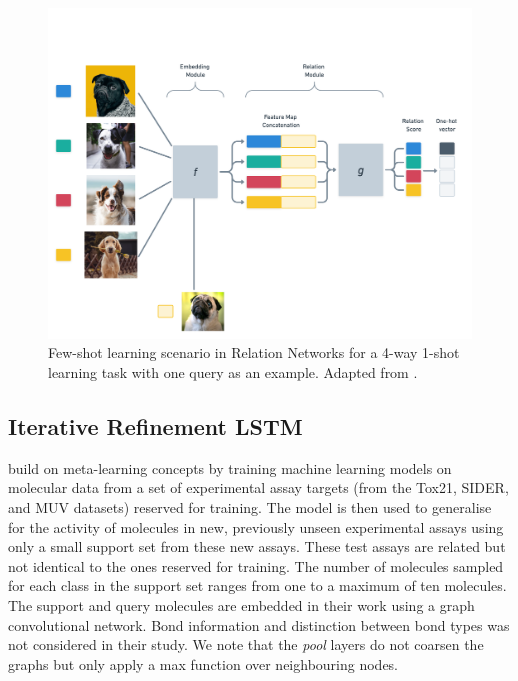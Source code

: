 \begin{figure}[h]
    \centering
    \includegraphics[width=0.9\linewidth]{img/RelationNetAdapt.png}
    \caption[Relation Networks]{Few-shot learning scenario in Relation Networks for a 4-way 1-shot learning task with one query as an example. Adapted from \citet{sung2018learning}.}
    \label{fig:relationnets}
\end{figure}

\subsection{Iterative Refinement LSTM}

\citet{altae2017low} build on meta-learning concepts by training machine learning models on molecular data from a set of experimental assay targets (from the Tox21, SIDER, and MUV datasets) reserved for training. The model is then used to generalise for the activity of molecules in new, previously unseen experimental assays using only a small support set from these new assays. These test assays are related but not identical to the ones reserved for training. The number of molecules sampled for each class in the support set ranges from one to a maximum of ten molecules. The support and query molecules are embedded in their work using a graph convolutional network. Bond information and distinction between bond types was not considered in their study. We note that the \textit{pool} layers do not coarsen the graphs but only apply a max function over neighbouring nodes.


